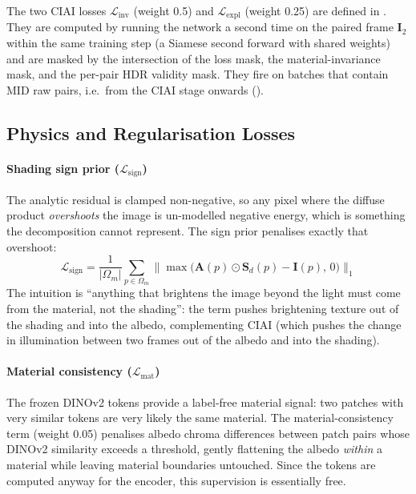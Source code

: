 The two CIAI losses $\mathcal{L}_{\text{inv}}$ (weight 0.5) and
$\mathcal{L}_{\text{expl}}$ (weight 0.25) are defined in .
They are computed by running the network a second time on the paired frame
$\mathbf{I}_2$ within the same training step (a Siamese second forward with
shared weights) and are masked by the intersection of the loss mask, the
material-invariance mask, and the per-pair HDR validity mask.
They fire on batches that contain MID raw pairs, i.e.\ from the CIAI stage
onwards ().

\subsection{Physics and Regularisation Losses}

\paragraph{Shading sign prior ($\mathcal{L}_{\text{sign}}$)}
The analytic residual is clamped non-negative, so any pixel where the diffuse
product \emph{overshoots} the image is un-modelled negative energy, which is something
the decomposition cannot represent.
The sign prior penalises exactly that overshoot:
\begin{equation}
  \mathcal{L}_{\text{sign}} =
  \frac{1}{|\Omega_m|}\sum_{p \in \Omega_m}
  \bigl\| \max\bigl(\mathbf{A}(p) \odot \mathbf{S}_d(p) - \mathbf{I}(p),\, 0\bigr) \bigr\|_1
  \label{eq:l_sign}
\end{equation}
The intuition is ``anything that brightens the image beyond the light must come
from the material, not the shading'': the term pushes brightening texture out of
the shading and into the albedo, complementing CIAI (which pushes the change in
illumination between two frames out of the albedo and into the shading).

\paragraph{Material consistency ($\mathcal{L}_{\text{mat}}$)}
The frozen DINOv2 tokens provide a label-free material signal: two patches with
very similar tokens are very likely the same material.
The material-consistency term (weight 0.05) penalises albedo chroma differences
between patch pairs whose DINOv2 similarity exceeds a threshold, gently
flattening the albedo \emph{within} a material while leaving material boundaries
untouched.
Since the tokens are computed anyway for the encoder, this supervision is
essentially free.


